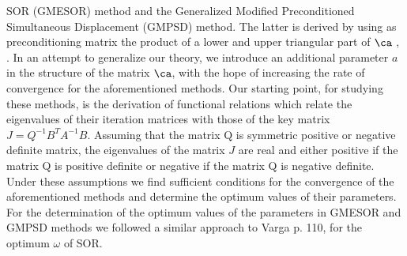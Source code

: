 \documentclass{report}
\begin{document}
SOR (GMESOR) method and the Generalized Modified Preconditioned
Simultaneous Displacement (GMPSD) method. The latter is derived by using
as preconditioning matrix the product of a lower and upper triangular
part of $\ca$ \cite{Louka}, \cite{LoukMis2}.
In an attempt to generalize our theory, we introduce an additional
parameter $a$ in the structure of the matrix $\ca$, with the hope of
increasing the rate of convergence for the aforementioned methods. Our
starting point, for studying these methods, is the derivation of
functional relations which relate the eigenvalues of their iteration
matrices with those of the key matrix $J=Q^{-1}B^TA^{-1}B$. Assuming that
the matrix Q is symmetric positive or negative definite matrix, the
eigenvalues of the matrix $J$ are real and either positive if the matrix
Q is positive definite or negative if the matrix Q is negative definite.
Under these assumptions we find sufficient conditions for the convergence
of the aforementioned methods and determine the optimum values of their
parameters. For the determination of the optimum values of the parameters
in GMESOR and GMPSD methods we followed a similar approach to Varga
\cite{Var1} p. 110, for the optimum $\omega$ of SOR.
\end{document}

